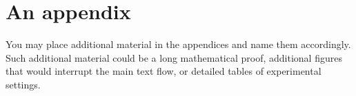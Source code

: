 \chapter{An appendix}  

{
    \color{orange}
    You may place additional material in the appendices and name them accordingly. 
    Such additional material could be a long mathematical proof, additional figures that would interrupt the main text flow, or detailed tables of experimental settings.

}
